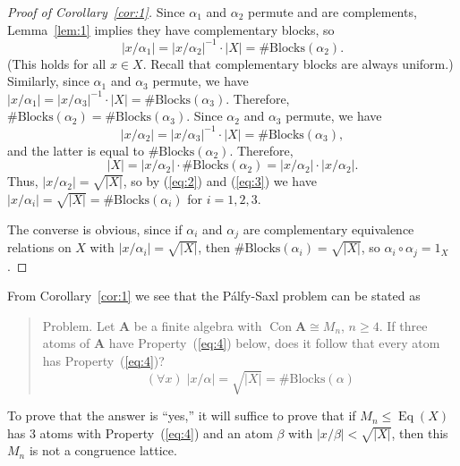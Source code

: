 \documentclass{amsart}
\theoremstyle{plain}
\theoremstyle{definition}
\theoremstyle{definition}
\numberwithin{equation}{section}
\newcommand{\<}{\ensuremath{\langle}}
\renewcommand{\>}{\ensuremath{\rangle}}
\renewcommand{\leq}{\ensuremath{\leqslant}}
\renewcommand{\geq}{\ensuremath{\geqslant}}
\newcommand{\Palfy}{P\'alfy}
\newcommand{\bA}{\ensuremath{\mathbf{A}}}
\newcommand{\Con}{\ensuremath{\operatorname{Con}}}
\newcommand{\Eq}{\ensuremath{\operatorname{Eq}}}
\newcommand{\nb}[1]{\ensuremath{\#\mathrm{Blocks}(#1)}}
\begin{document}
\begin{proof}[Proof of Corollary~\ref{cor:1}]
Since $\alpha_1$ and $\alpha_2$ permute and are complements, Lemma~\ref{lem:1}
implies they have complementary blocks, so
\begin{equation}
  \label{eq:2}
|x/\alpha_1| = |x/\alpha_2|^{-1} \cdot |X|= \nb{\alpha_2}.
\end{equation}
(This holds for all $x\in X$. Recall that complementary blocks are always
uniform.) 
Similarly, since $\alpha_1$ and $\alpha_3$ permute, we have
$|x/\alpha_1| = |x/\alpha_3|^{-1} \cdot |X| = \nb{\alpha_3}$.
Therefore, $\nb{\alpha_2} = \nb{\alpha_3}$.  Since 
$\alpha_2$ and $\alpha_3$ permute, we have
\begin{equation}
  \label{eq:3}
|x/\alpha_2| = |x/\alpha_3|^{-1} \cdot |X|= \nb{\alpha_3},
\end{equation}
and the latter is equal to $\nb{\alpha_2}$.  Therefore,
\[
|X| = |x/\alpha_2| \cdot \nb{\alpha_2} = |x/\alpha_2| \cdot |x/\alpha_2|. 
\]
Thus, $|x/\alpha_2|  = \sqrt{|X|}$, so by (\ref{eq:2}) and (\ref{eq:3}) we have 
$|x/\alpha_i| = \sqrt{|X|} = \nb{\alpha_i}$ for $i = 1, 2, 3$.

The converse is obvious, since if $\alpha_i$ and $\alpha_j$ are
complementary equivalence relations on $X$ with 
$|x/\alpha_i| = \sqrt{|X|}$, then 
$\nb{\alpha_i} = \sqrt{|X|}$, so
$\alpha_i \circ \alpha_j = 1_X$.
\end{proof}

From Corollary~\ref{cor:1} we see that the \Palfy-Saxl problem can be stated as
\begin{quote}
  {\sc Problem.} Let $\bA$ be a finite algebra with $\Con \bA \cong M_n$, $n\geq
  4$. %
If three atoms of $\bA$ have Property~(\ref{eq:4}) below, does it follow
  that every atom has Property~(\ref{eq:4})?
  \begin{equation}
    \label{eq:4}
(\forall x) \; |x/\alpha|  = \sqrt{|X|} = \nb{\alpha}
  \end{equation}
\end{quote}

\bigskip


\noindent To prove that the answer is ``yes,'' it will suffice to prove that 
if $M_n\leq \Eq(X)$ has 3 atoms 
with Property~(\ref{eq:4}) and
an atom $\beta$ with $|x/\beta| < \sqrt{|X|}$, then this $M_n$ is not a
congruence lattice.  
\end{document}
